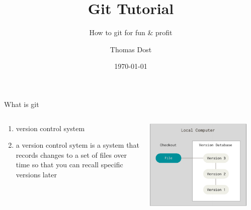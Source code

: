 \documentclass{beamer}
\title{Git Tutorial}
\subtitle{How to git for fun \& profit }
\author{Thomas Dost}
\date{\today}
\begin{document}
\begin{frame}
\titlepage
\end{frame}

\begin{frame}[fragile,t]{What is git}
  \begin{columns}
    \begin{column}{0.5\textwidth}
      \begin{enumerate}
        \item version control system
        \item a version control sytem is a system that records changes to a set of files over time so that you can recall specific versions later
      \end{enumerate}
    \end{column}
    \begin{column}{0.5\textwidth}
      \includegraphics[width=0.9\textwidth,height=0.6\textheight]{screenshots/2022-03-27-110459_634x543_scrot.png}
    \end{column}
  \end{columns}
\end{frame}
\end{document}
